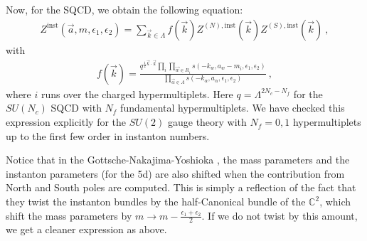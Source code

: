 \documentclass[letterpaper, 11pt]{article}
\def\IC{\mathbb{C}}
\def\a{\alpha}
\def\e{\epsilon}
\def\half{\frac{1}{2}}
\begin{document}
Now, for the SQCD, we obtain the following equation:
\begin{align}
  Z^{\textrm{inst}}(\vec{a}, m, \e_1, \e_2) = \sum_{\vec{k} \in \Lambda} f(\vec{k}) Z^{(N), \textrm{inst}}(\vec{k} ) Z^{(S), \textrm{inst}}(\vec{k}) \ , 
\end{align}
with
\begin{align}
 f(\vec{k}) =  \frac{\displaystyle q^{\half \vec{k} \cdot \vec{k}} \prod_{i} \prod_{\vec{w} \in R_i}  s(-k_w, a_w - m_i, \e_1, \e_2)}{\displaystyle \prod_{\vec{\a} \in \Lambda} s(-k_\a, a_\a, \e_1, \e_2)} \ , 
\end{align} 
where $i$ runs over the charged hypermultiplets. Here $q = \Lambda^{2N_c - N_f}$ for the $SU(N_c)$ SQCD with $N_f$ fundamental hypermultiplets. 
We have checked this expression explicitly for the $SU(2)$ gauge theory with $N_f=0, 1$ hypermultiplets up to the first few order in instanton numbers. 

Notice that in the Gottsche-Nakajima-Yoshioka \cite{Nakajima:2009qjc, Gottsche:2010ig}, the mass parameters and the instanton parameters (for the 5d) are also shifted when the contribution from North and South poles are computed. This is simply a reflection of the fact that they twist the instanton bundles by the half-Canonical bundle of the $\IC^2$, which shift the mass parameters by $m \to m - \frac{\e_1 + \e_2}{2}$. If we do not twist by this amount, we get a cleaner expression as above. 
\end{document}
